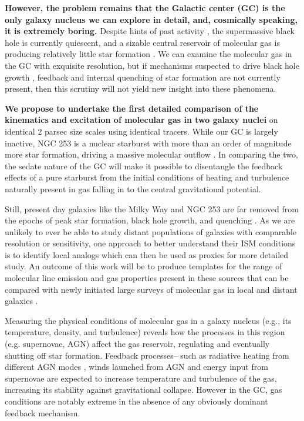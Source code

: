 \documentclass{aastex62}
\begin{document}
{\bf However, the problem remains that the Galactic center (GC) is the only galaxy nucleus we can explore in detail, and, cosmically speaking, it is extremely boring.} Despite hints of past activity \citep{Ponti10,SSF10,SF12}, the supermassive black hole is currently quiescent, and a sizable central reservoir of molecular gas is producing relatively little star formation \citep{Longmore13}. We can examine the molecular gas in the GC with exquisite resolution, but if mechanisms suspected to drive black hole growth \citep[through active accretion from a `torus';][]{LB69,Netzer15}, feedback and internal quenching of star formation \citep[either from star formation itself or AGN;][]{DS12,DM05} are not currently present, then this scrutiny will not yield new insight into these phenomena. %

{\bf We propose to undertake the first detailed comparison of the kinematics and excitation of molecular gas in two galaxy nuclei} on identical 2 parsec size scales using identical tracers. While our GC is largely inactive, NGC 253 is a nuclear starburst with more than an order of magnitude more star formation, driving a massive molecular outflow \citep{Bolatto13}. In comparing the two, the sedate nature of the GC will make it possible to disentangle the feedback effects of a pure starburst \citep[like the GC, the black hole at the center of NGC 253 is believed to be quiescent;][]{MS10,Lehmer13} from the initial conditions of heating and turbulence naturally present in gas falling in to the central gravitational potential. 

Still, present day galaxies like the Milky Way and NGC 253 are far removed from the epochs of peak star formation, black hole growth, and quenching \citep[z$>$ 1;][]{Madau98, Hasinger05, Whitaker12}.  As we are unlikely to ever be able to study distant populations of galaxies with comparable resolution or sensitivity, one approach to better understand their ISM conditions is to identify local analogs which can then be used as proxies for more detailed study. An outcome of this work will be to produce templates for the range of molecular line emission and gas properties present in these sources that can be compared with newly initiated large surveys of molecular gas in local and distant galaxies \citep[e.g., PHANGS and ASPECS;][]{Walter16,Leroy16}. 

Measuring the physical conditions of molecular gas in a galaxy nucleus (e.g., its temperature, density, and turbulence) reveals how the processes in this region (e.g. supernovae, AGN) affect the gas reservoir, regulating and eventually shutting off star formation. Feedback processes-- such as radiative heating from different AGN modes \citep[e.g.,][]{Xie17}, winds launched from AGN \citep[e.g.,][]{Yuan16} and energy input from supernovae \citep{Efst00} are expected to increase temperature and turbulence of the gas, increasing its stability against gravitational collapse. However in the GC, gas conditions are notably extreme \citep[T$>$50-400 K, $\sigma>$ 10 km/s on 10 pc size scales;][]{Shetty12,Mills13a,Ginsburg16} in the absence of any obviously dominant feedback mechanism. 
\end{document}

